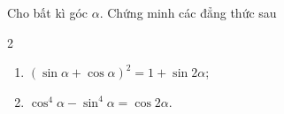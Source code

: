 \begin{bt}%
Cho bất kì góc $\alpha$. Chứng minh các đẳng thức sau
\begin{multicols}{2}
	\begin{enumerate}
		\item $\left(\sin \alpha+\cos\alpha\right)^2=1+\sin 2\alpha$;
		\item $\cos^4\alpha-\sin^4\alpha=\cos 2\alpha$.
	\end{enumerate}
\end{multicols}
\end{bt}

